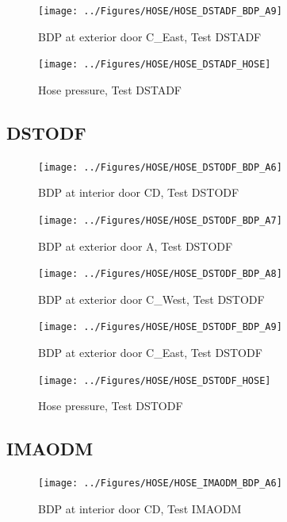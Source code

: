 \documentclass[11pt,oneside]{book}
\begin{document}
\begin{figure}[!ht]
\texttt{[image: ../Figures/HOSE/HOSE\_DSTADF\_BDP\_A9]}
\caption{BDP at exterior door C\_East, Test DSTADF}
\label{fig:HOSE_DSTADF_BDP_A9}
\end{figure}

\begin{figure}[!ht]
\texttt{[image: ../Figures/HOSE/HOSE\_DSTADF\_HOSE]}
\caption{Hose pressure, Test DSTADF}
\label{fig:HOSE_DSTADF_HOSE}
\end{figure}


\clearpage


\subsection{DSTODF}

\begin{figure}[!ht]
\texttt{[image: ../Figures/HOSE/HOSE\_DSTODF\_BDP\_A6]}
\caption{BDP at interior door CD, Test DSTODF}
\label{fig:HOSE_DSTODF_BDP_A6}
\end{figure}

\begin{figure}[!ht]
\texttt{[image: ../Figures/HOSE/HOSE\_DSTODF\_BDP\_A7]}
\caption{BDP at exterior door A, Test DSTODF}
\label{fig:HOSE_DSTODF_BDP_A7}
\end{figure}

\begin{figure}[!ht]
\texttt{[image: ../Figures/HOSE/HOSE\_DSTODF\_BDP\_A8]}
\caption{BDP at exterior door C\_West, Test DSTODF}
\label{fig:HOSE_DSTODF_BDP_A8}
\end{figure}

\begin{figure}[!ht]
\texttt{[image: ../Figures/HOSE/HOSE\_DSTODF\_BDP\_A9]}
\caption{BDP at exterior door C\_East, Test DSTODF}
\label{fig:HOSE_DSTODF_BDP_A9}
\end{figure}

\begin{figure}[!ht]
\texttt{[image: ../Figures/HOSE/HOSE\_DSTODF\_HOSE]}
\caption{Hose pressure, Test DSTODF}
\label{fig:HOSE_DSTODF_HOSE}
\end{figure}


\clearpage


\subsection{IMAODM}

\begin{figure}[!ht]
\texttt{[image: ../Figures/HOSE/HOSE\_IMAODM\_BDP\_A6]}
\caption{BDP at interior door CD, Test IMAODM}
\label{fig:HOSE_IMAODM_BDP_A6}
\end{figure}
\end{document}
